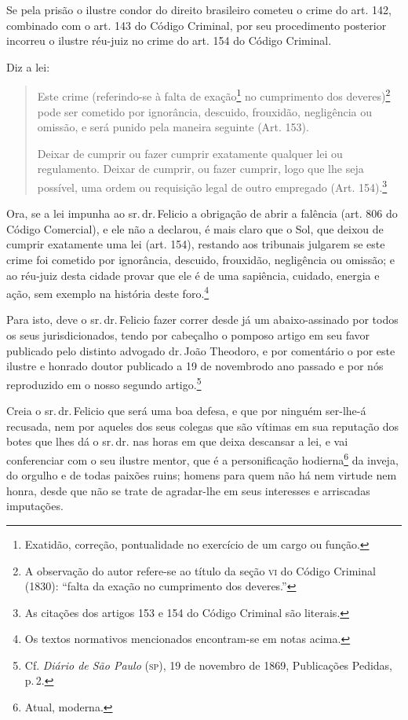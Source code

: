 Se pela prisão o ilustre condor do direito brasileiro cometeu o crime do
art. 142, combinado com o art. 143 do Código Criminal, por seu
procedimento posterior incorreu o ilustre réu-juiz no crime do art. 154
do Código Criminal.

Diz a lei:

\begin{quote}
Este crime (referindo-se à falta de exação\footnote{ Exatidão,
  correção, pontualidade no exercício de um cargo ou função.} no
cumprimento dos deveres)\footnote{ A observação do autor refere-se ao
  título da seção \textsc{vi} do Código Criminal (1830): ``falta da exação no
  cumprimento dos deveres.''} pode ser cometido por ignorância, descuido,
frouxidão, negligência ou omissão, e será punido pela maneira seguinte
(Art. 153).

Deixar de cumprir ou fazer cumprir exatamente qualquer lei ou
regulamento. Deixar de cumprir, ou fazer cumprir, logo que lhe seja
possível, uma ordem ou requisição legal de outro empregado (Art.
154).\footnote{ As citações dos artigos 153 e 154 do Código Criminal
  são literais.}
\end{quote}

Ora, se a lei impunha ao sr.\,dr.\,Felicio a obrigação de abrir a falência
(art. 806 do Código Comercial), e ele não a declarou, é mais claro que o
Sol, que deixou de cumprir exatamente uma lei (art. 154), restando aos
tribunais julgarem se este crime foi cometido por ignorância, descuido,
frouxidão, negligência ou omissão; e ao réu-juiz desta cidade provar que
ele é de uma sapiência, cuidado, energia e ação, sem exemplo na história
deste foro.\footnote{ Os textos normativos mencionados encontram-se em
  notas acima.}

Para isto, deve o sr.\,dr.\,Felicio fazer correr desde já um
abaixo-assinado por todos os seus jurisdicionados, tendo por cabeçalho o
pomposo artigo em seu favor publicado pelo distinto advogado dr.\,João
Theodoro, e por comentário o por este ilustre e honrado doutor publicado
a 19 de novembrodo ano passado e por nós reproduzido em o nosso segundo
artigo.\footnote{ Cf. \emph{Diário de São Paulo} (\textsc{sp}), 19 de novembro de 1869,
  Publicações Pedidas, p.\,2.}

Creia o sr.\,dr.\,Felicio que será uma boa defesa, e que por ninguém
ser-lhe-á recusada, nem por aqueles dos seus colegas que são vítimas em
sua reputação dos botes que lhes dá o sr.\,dr. nas horas em que deixa
descansar a lei, e vai conferenciar com o seu ilustre mentor, que é a
personificação hodierna\footnote{ Atual, moderna.} da inveja, do
orgulho e de todas paixões ruins; homens para quem não há nem virtude
nem honra, desde que não se trate de agradar-lhe em seus interesses e
arriscadas imputações.

